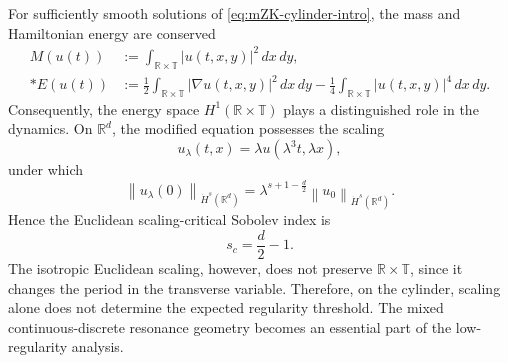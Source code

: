 \documentclass[12pt,oneside,reqno]{amsart}
\numberwithin{equation}{section}
\theoremstyle{plain}
\def\R{{\mathbb R}}
\def\T{{\mathbb T}}
\newcommand{\norm}[1]{%
    \left\lVert #1\right\rVert%
}
\begin{document}
For sufficiently smooth solutions of \eqref{eq:mZK-cylinder-intro}, the mass
and Hamiltonian energy are conserved
\begin{equation}
\begin{aligned}
    M(u(t))
    &:=
    \int_{\R\times\T}
    |u(t,x,y)|^2\,dx\,dy,
    \\*
    E(u(t))
    &:=
    \frac12
    \int_{\R\times\T}
    |\nabla u(t,x,y)|^2\,dx\,dy
    -
    \frac14
    \int_{\R\times\T}
    |u(t,x,y)|^4\,dx\,dy.
\end{aligned}
\end{equation}
Consequently, the energy space $H^1(\R\times\T)$ plays a distinguished role in the dynamics. On $\R^d$, the modified equation possesses the scaling
\begin{equation*}
    u_\lambda(t,x)
    =
    \lambda u(\lambda^3t,\lambda x),
\end{equation*}
under which
\begin{equation*}
    \norm{u_\lambda(0)}_{\dot H^s(\R^d)}
    =
    \lambda^{s+1-\frac d2}
    \norm{u_0}_{\dot H^s(\R^d)}.
\end{equation*}
Hence the Euclidean scaling-critical Sobolev index is
\begin{equation*}
    s_c=\frac d2-1.
\end{equation*}
The isotropic Euclidean scaling, however, does not preserve
$\R\times\T$, since it changes the period in the transverse variable. Therefore, on the cylinder, scaling alone does not determine the expected
regularity threshold. The mixed continuous-discrete resonance geometry
becomes an essential part of the low-regularity analysis.
\end{document}
